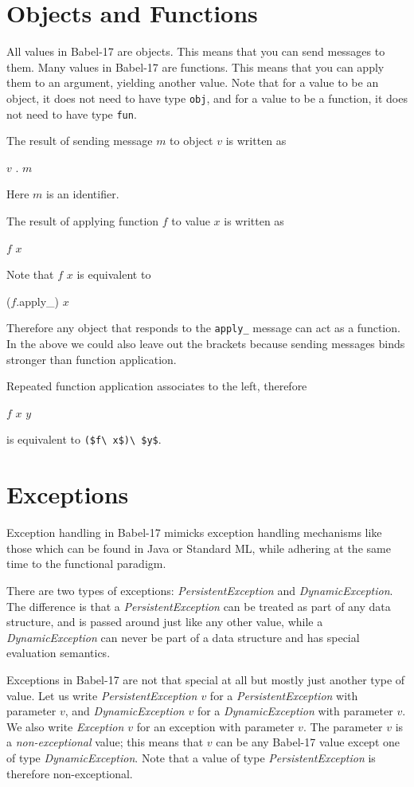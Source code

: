 \documentclass[11pt]{amsart}
\newcommand{\metababel}[1] {\textsl{#1}}
\newcommand{\babelsrc}[1] {\lstinline!#1!}
\begin{document}
\section{Objects and Functions}
All values in Babel-17 are objects. This means that you can send messages to them. Many values in Babel-17 are functions. This means that you can apply them to an argument, yielding another value. Note that for a value to be an object, it does not need to have type \texttt{obj}, and for a value to be a function,  it does not need to have type \texttt{fun}. 

The result of sending message $m$ to object $v$  is written as
\begin{babellisting}
$v$ . $m$
\end{babellisting}
Here $m$ is an identifier.

The result of applying function $f$ to value $x$ is written as 
\begin{babellisting}
$f$ $x$
\end{babellisting}
Note that $f$ $x$ is equivalent to 
\begin{babellisting}
($f$.apply_) $x$
\end{babellisting}
Therefore any object that responds to the \babelsrc{apply_} message can act as a function.
In the above we could also leave out the brackets because sending messages binds stronger than function application. 

Repeated function application associates to the left, therefore 
\begin{babellisting}
$f$ $x$ $y$ 
\end{babellisting} 
is equivalent to \babelsrc{($f\ x$)\ $y$}.

\section{Exceptions}
Exception handling in Babel-17 mimicks exception handling mechanisms like those which can be found in Java or Standard ML, while adhering at the same time to the functional paradigm.

There are two types of exceptions: \metababel{PersistentException} and  \metababel{DynamicException}.
The difference is that a \metababel{PersistentException}  can be treated as part of any data structure, and is passed around just like any other value, while a \metababel{DynamicException} can never be part of a data structure and has special evaluation semantics. 

Exceptions in Babel-17 are not that special at all but mostly just another type of value.  Let us write \metababel{PersistentException $v$} for a \metababel{PersistentException} with parameter $v$,
and  \metababel{DynamicException $v$} for a \metababel{DynamicException} with parameter $v$. 
We also write \metababel{Exception $v$} for an exception with parameter $v$. The parameter $v$ is a \emph{non-exceptional} value; this means that $v$ can be any Babel-17 value except one of type \metababel{DynamicException}. Note that a value of type \metababel{PersistentException} is therefore non-exceptional.
\end{document}
